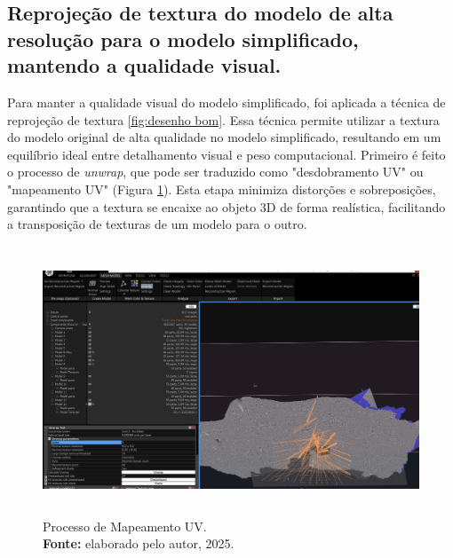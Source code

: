   \subsection{Reprojeção de textura do modelo de alta resolução para o modelo simplificado, mantendo a qualidade visual.} 
  
Para manter a qualidade visual do modelo simplificado, foi aplicada a técnica de reprojeção de textura \ref{fig:desenho bom}. Essa técnica permite utilizar a textura do modelo original de alta qualidade no modelo simplificado, resultando em um equilíbrio ideal entre detalhamento visual e peso computacional. Primeiro é feito o processo de \textit{unwrap}, que pode ser traduzido como "desdobramento UV" ou "mapeamento UV" (Figura \ref{fig:unwrap}). Esta etapa minimiza distorções e sobreposições, garantindo que a textura se encaixe ao objeto 3D de forma realística, facilitando a transposição de texturas de um modelo para o outro. 
\begin{figure}[H]
        \centering
        \includegraphics[height=8cm, keepaspectratio]{img/reality e fotogrametria processo/unwrap.png}
        \caption{Processo de Mapeamento UV. \\
            \textbf{Fonte:} elaborado pelo autor, 2025.}
        \label{fig:unwrap}
\end{figure}

